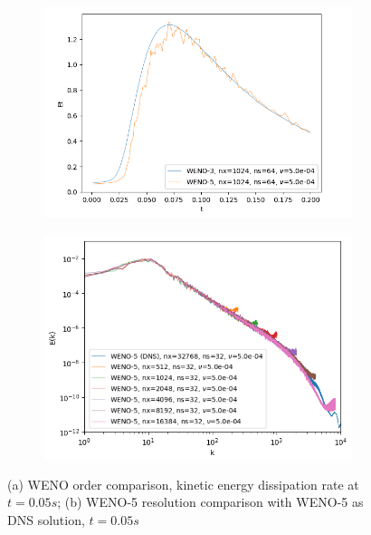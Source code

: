 \documentclass[conf]{new-aiaa}
\begin{document}
\begin{figure}[hbt!]
\centering

\begin{subfigure}[t]{0.49\textwidth}
	\centering
	\includegraphics[width=0.99\textwidth]{figures/WENO_Order_1024_Et_vs_t.png}
	\caption{\label{fig:weno_order_diss_rate}}
\end{subfigure}
\begin{subfigure}[t]{0.49\textwidth}
	\centering
	\includegraphics[width=0.99\textwidth]{figures/WENO5_DNS_Ek_vs_k.png}
	\caption{\label{fig:weno5_dns}}
\end{subfigure}

\caption{(a) WENO order comparison, kinetic energy dissipation rate at $t=0.05s$;
		 (b) WENO-5 resolution comparison with WENO-5 as DNS solution, $t=0.05s$}
\end{figure}
\end{document}
